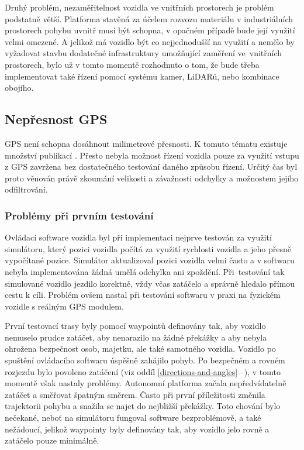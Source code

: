 \documentclass[czech, bachelor]{diploma}
\newcommand{\peteref}[1]{\ref{#1}\,--\,\nameref{#1}}
\begin{document}
Druhý problém, nezaměřitelnost vozidla ve vnitřních prostorech je problém podstatně větší. Platforma stavěná za účelem rozvozu
materiálu v industriálních prostorech pohybu uvnitř musí být schopna, v opačném případě bude její využití velmi omezené. A jelikož
má vozidlo být co nejjednodušší na využití a nemělo by vyžadovat stavbu dodatečné infrastruktury umožňující zaměření ve~vnitřních
prostorech, bylo už v tomto momentě rozhodnuto o tom, že bude třeba implementovat také řízení pomocí systému kamer, LiDARů, nebo
kombinace obojího.

\subsection{Nepřesnost GPS} \label{gps-inaccuracy}

GPS není schopna dosáhnout milimetrové přesnosti. K tomuto tématu existuje množství publikací \cite{gps-inaccuracy-source}. Přesto
nebyla možnost řízení vozidla pouze za využití vstupu z GPS zavržena bez dostatečného testování daného způsobu řízení. Určitý čas
byl proto věnován právě zkoumání velikosti a závažnosti odchylky a možnostem jejího odfiltrování.

\subsubsection{Problémy při prvním testování}

Ovládací software vozidla byl při implementaci nejprve testován za využití simulátoru, který pozici vozidla počítá za využití
rychlosti vozidla a jeho přesně vypočítané pozice. Simulátor aktualizoval pozici vozidla velmi často a v softwaru nebyla
implementována žádná umělá odchylka ani zpoždění. Při~testování tak simulované vozidlo jezdilo korektně, vždy včas zatáčelo a
správně hledalo přímou cestu k cíli. Problém ovšem nastal při testování softwaru v praxi na fyzickém vozidle s reálným GPS
modulem.

První testovací trasy byly pomocí waypointů definovány tak, aby vozidlo nemuselo prudce zatáčet, aby nenarazilo na žádné překážky
a aby nebyla ohrožena bezpečnost osob, majetku, ale také samotného vozidla. Vozidlo po spuštění ovládacího softwaru úspěšně
zahájilo pohyb. Po bezpečném a rovném rozjezdu bylo povoleno zatáčení (viz oddíl \peteref{directions-and-angles}), v tomto
momentě však nastaly problémy. Autonomní platforma začala nepředvídatelně zatáčet a směřovat špatným směrem. Často při první
příležitosti změnila trajektorii pohybu a snažila se najet do nejbližší překážky. Toto chování bylo nečekané, neboť na simulátoru
fungoval software bezproblémově, a také nežádoucí, jelikož waypointy byly definovány tak, aby vozidlo jelo rovně a zatáčelo pouze
minimálně.
\end{document}
